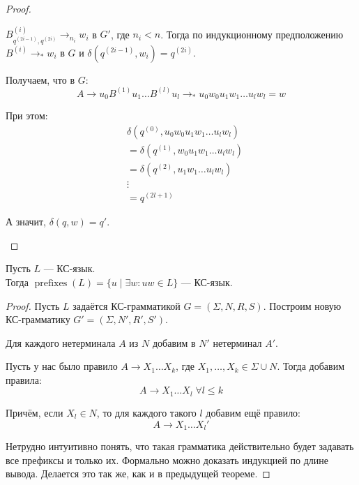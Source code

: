 \begin{proof}
\begin{itemize}
\begin{itemize}
            $B^{(i)}_{q^{(2i - 1)}, q^{(2i)}} \to_{n_i} w_i$ в $G'$, где $n_i < n$. Тогда по индукционному предположению $B^{(i)} \to_* w_i$ в $G$ и $\delta(q^{(2i - 1)}, w_i) = q^{(2i)}$.

            Получаем, что в $G$:
            $$ A \to u_0 B^{(1)} u_1 \dots B^{(l)} u_l \to_* u_0 w_0 u_1 w_1 \dots u_l w_l = w $$

            При этом:
            \begin{align*}
                & \delta(q^{(0)}, u_0 w_0 u_1 w_1 \dots u_l w_l) \\
                &= \delta(q^{(1)}, w_0 u_1 w_1 \dots u_l w_l) \\
                &= \delta(q^{(2)}, u_1 w_1 \dots u_l w_l) \\
                & \vdots \\
                &= q^{(2l + 1)}
            \end{align*}

            А значит, $\delta(q, w) = q'$.
        \end{itemize} 
    \end{itemize}
\end{proof}

\begin{theorem}
    Пусть $L$ --- КС-язык. \\ 
    Тогда $\operatorname{prefixes}(L) = \{ u \mid \exists w : uw \in L \}$ --- КС-язык.
\end{theorem}
\begin{proof}
    Пусть $L$ задаётся КС-грамматикой $G = (\Sigma, N, R, S)$. Построим новую КС-грамматику $G' = (\Sigma, N', R', S')$.

    Для каждого нетерминала $A$ из $N$ добавим в $N'$ нетерминал $A'$.

    Пусть у нас было правило $A \to X_1 \dots X_k$, где $X_1, \dots, X_k \in \Sigma \cup N$. Тогда добавим правила:
    $$ A \to X_1 \dots X_l \; \forall l \leqslant k$$
    
    Причём, если $X_l \in N$, то для каждого такого $l$ добавим ещё правило:
    $$ A \to X_1 \dots X_l' $$

    Нетрудно интуитивно понять, что такая грамматика действительно будет задавать все префиксы и только их. Формально можно доказать индукцией по длине вывода. Делается это так же, как и в предыдущей теореме.
\end{proof}